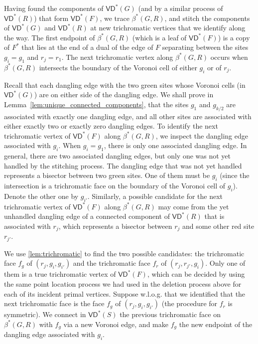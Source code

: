 \documentclass{article}
\newcommand{\VD}{\textsf{VD}}
\begin{document}
Having found the components of $\VD^*(G)$ (and by a similar process of $\VD^*(R)$) that form $\VD^*(F)$, we trace $\beta^*(G,R)$, and stitch the components of $\VD^*(G)$ and $\VD^*(R)$ at new trichromatic vertices that we identify along the way.
The first endpoint of $\beta^*(G,R)$ (which is a leaf of $\VD^*(F)$) is a copy of $F^*$ that lies at the end of a dual of the edge of $F$ separating between the sites $g_i=g_1$ and $r_j = r_1$.
The next trichromatic vertex along $\beta^*(G,R)$ occurs when $\beta^*(G,R)$ intersects  the boundary of the Voronoi cell of either $g_i$ or of $r_j$.

Recall that each dangling edge with the two green sites whose Voronoi cells (in $\VD^*(G)$) are on either side of the dangling edge. We shall prove in Lemma~\ref{lem:unique_connected_components},
that the sites $g_1$ and $g_{k/2}$ are associated with exactly one dangling edge, and all other sites are associated with either exactly two or exactly zero dangling edges.
To identify the next trichromatic vertex of $\VD^*(F)$ along $\beta^*(G,R)$, we inspect the dangling edge associated with $g_i$. When $g_i=g_1$, there is only one associated dangling edge. In general, there are two associated dangling edges, but only one was not yet handled by the stitching process.
 The dangling edge that was not yet handled represents a bisector between two green sites. One of them must be $g_i$ (since the intersection is a trichromatic face on the boundary of the Voronoi cell of $g_i$).
Denote the other one by $g_{i'}$. Similarly, a possible candidate for the next trichromatic vertex of $\VD^*(F)$ along $\beta^*(G,R)$ may come from the yet unhandled dangling edge of a connected component of $\VD^*(R)$ that is associated with $r_j$, which represents a bisector between $r_j$ and some other red site $r_{j'}$.

We use \cref{lem:trichromatic} to  find the two possible candidates: the trichromatic face $f_g$ of $(r_j, g_i, g_{i'})$ and the trichromatic face $f_r$ of $(r_j, r_{j'}, g_i)$. Only one of them is a true trichromatic vertex of $\VD^*(F)$, which can be decided by using the same point location process we had used in the deletion process above for each of its incident primal vertices.
Suppose w.l.o.g. that we identified that the next trichromatic face is the face $f_g$ of $(r_j, g_i, g_{i'})$ (the procedure for $f_r$ is symmetric).
We connect in $\VD^*(S)$ the previous trichromatic face on $\beta^*(G,R)$ with $f_g$ via a new Voronoi edge, and make $f_g$ the new endpoint of the dangling edge associated with $g_i$.
\end{document}
